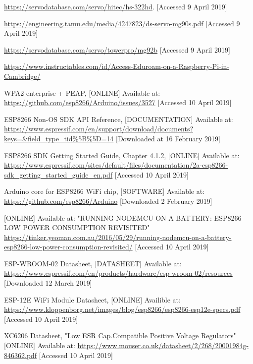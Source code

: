 \documentclass[onecolumn]{IEEEtran}
\begin{document}
{\begin{thebibliography}{10}
    \url{https://servodatabase.com/servo/hitec/hs-322hd}. [Accessed 9 April 2019]
    
    \url{https://engineering.tamu.edu/media/4247823/ds-servo-mg90s.pdf} [Accessed 9 April 2019]
    
    \url{https://servodatabase.com/servo/towerpro/mg92b} [Accessed 9 April 2019]
    
    \url{ https://www.instructables.com/id/Access-Eduroam-on-a-Raspberry-Pi-in-Cambridge/}
    
    WPA2-enterprise + PEAP,
    [ONLINE] Available at:
    \url{https://github.com/esp8266/Arduino/issues/3527}
    [Accessed 10 April 2019]
    
    ESP8266 Non-OS SDK API Reference,
    [DOCUMENTATION] Available at:
    \url{https://www.espressif.com/en/support/download/documents?keys=&field_type_tid\%5B\%5D=14}
    [Downloaded at 16 February 2019]
    
    ESP8266 SDK Getting Started Guide, Chapter 4.1.2,
    [ONLINE] Available at:
    \url{https://www.espressif.com/sites/default/files/documentation/2a-esp8266-sdk_getting_started_guide_en.pdf}
    [Accessed 10 April 2019]
    
    Arduino core for ESP8266 WiFi chip,
    [SOFTWARE] Available at:
    \url{https://github.com/esp8266/Arduino}
    [Downloaded 2 February 2019]
    
    [ONLINE] Available at:
    "RUNNING NODEMCU ON A BATTERY: ESP8266 LOW POWER CONSUMPTION REVISITED"
    \url{https://tinker.yeoman.com.au/2016/05/29/running-nodemcu-on-a-battery-esp8266-low-power-consumption-revisited/}
    [Accessed 10 April 2019]
    
    ESP-WROOM-02 Datasheet,
    [DATASHEET] Available at:
    \url{https://www.espressif.com/en/products/hardware/esp-wroom-02/resources}
    [Downloaded 12 March 2019]
    
    ESP-12E WiFi Module Datasheet,
    [ONLINE] Availible at: 
    \url{https://www.kloppenborg.net/images/blog/esp8266/esp8266-esp12e-specs.pdf}
    [Accessed 10 April 2019]
    
    XC6206 Datasheet,
    "Low ESR Cap.Compatible Positive Voltage Regulators"
    [ONLINE] Available at:
    \url{https://www.mouser.co.uk/datasheet/2/268/20001984g-846362.pdf}
    [Accessed 10 April 2019]
    

\end{thebibliography}}
\end{document}
